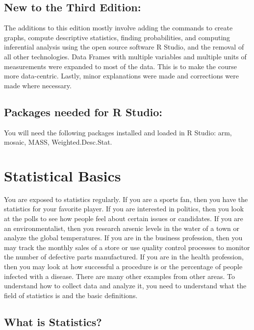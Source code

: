 \documentclass[]{book}
\begin{document}
\hypertarget{new-to-the-third-edition}{%
\section{New to the Third Edition:}\label{new-to-the-third-edition}}

The additions to this edition mostly involve adding the commands to create graphs, compute descriptive statistics, finding probabilities, and computing inferential analysis using the open source software R Studio, and the removal of all other technologies. Data Frames with multiple variables and multiple units of measurements were expanded to most of the data. This is to make the course more data-centric. Lastly, minor explanations were made and corrections were made where necessary.

\hypertarget{packages-needed-for-r-studio}{%
\section{Packages needed for R Studio:}\label{packages-needed-for-r-studio}}

You will need the following packages installed and loaded in R Studio: arm, mosaic, MASS, Weighted.Desc.Stat.

\hypertarget{statistical-basics}{%
\chapter{Statistical Basics}\label{statistical-basics}}

You are exposed to statistics regularly. If you are a sports fan, then you have the statistics for your favorite player. If you are interested in politics, then you look at the polls to see how people feel about certain issues or candidates. If you are an environmentalist, then you research arsenic levels in the water of a town or analyze the global temperatures. If you are in the business profession, then you may track the monthly sales of a store or use quality control processes to monitor the number of defective parts manufactured. If you are in the health profession, then you may look at how successful a procedure is or the percentage of people infected with a disease. There are many other examples from other areas. To understand how to collect data and analyze it, you need to understand what the field of statistics is and the basic definitions.

\hypertarget{what-is-statistics}{%
\section{What is Statistics?}\label{what-is-statistics}}
\end{document}

